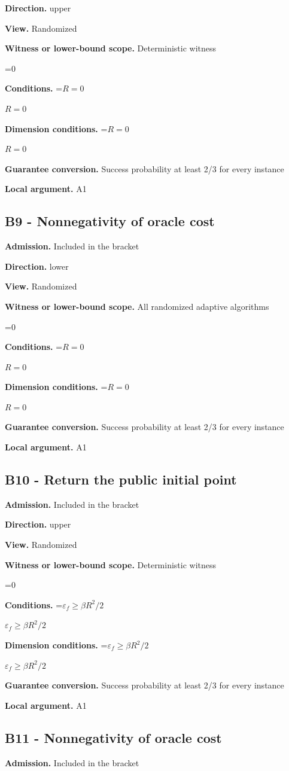 \documentclass[10pt,a4paper]{article}
\newcommand{\AtlasMath}[1]{\par\begingroup\centering\setbox0=\hbox{$\displaystyle #1$}\ifdim\wd0>1.4\linewidth\typeout{ATLAS WIDE FORMULA: \the\wd0}\fi\ifdim\wd0>\linewidth\resizebox{\linewidth}{!}{\box0}\else\box0\fi\par\endgroup}
\newcommand{\AtlasInlineMath}[1]{\begingroup\setbox0=\hbox{$#1$}\ifdim\wd0>.4\linewidth\endgroup\AtlasMath{#1}\else\endgroup$#1$\fi}
\begin{document}
\textbf{Direction.} upper

\textbf{View.} Randomized

\textbf{Witness or lower-bound scope.} Deterministic witness

\AtlasMath{0}
\textbf{Conditions.} \AtlasInlineMath{R=0}

\textbf{Dimension conditions.} \AtlasInlineMath{R=0}

\textbf{Guarantee conversion.} Success probability at least 2/3 for every instance

\textbf{Local argument.} A1

\subsection{B9 - Nonnegativity of oracle cost}
\textbf{Admission.} Included in the bracket

\textbf{Direction.} lower

\textbf{View.} Randomized

\textbf{Witness or lower-bound scope.} All randomized adaptive algorithms

\AtlasMath{0}
\textbf{Conditions.} \AtlasInlineMath{R=0}

\textbf{Dimension conditions.} \AtlasInlineMath{R=0}

\textbf{Guarantee conversion.} Success probability at least 2/3 for every instance

\textbf{Local argument.} A1

\subsection{B10 - Return the public initial point}
\textbf{Admission.} Included in the bracket

\textbf{Direction.} upper

\textbf{View.} Randomized

\textbf{Witness or lower-bound scope.} Deterministic witness

\AtlasMath{0}
\textbf{Conditions.} \AtlasInlineMath{\varepsilon_f\ge\beta R^2/2}

\textbf{Dimension conditions.} \AtlasInlineMath{\varepsilon_f\ge\beta R^2/2}

\textbf{Guarantee conversion.} Success probability at least 2/3 for every instance

\textbf{Local argument.} A1

\subsection{B11 - Nonnegativity of oracle cost}
\textbf{Admission.} Included in the bracket
\end{document}
